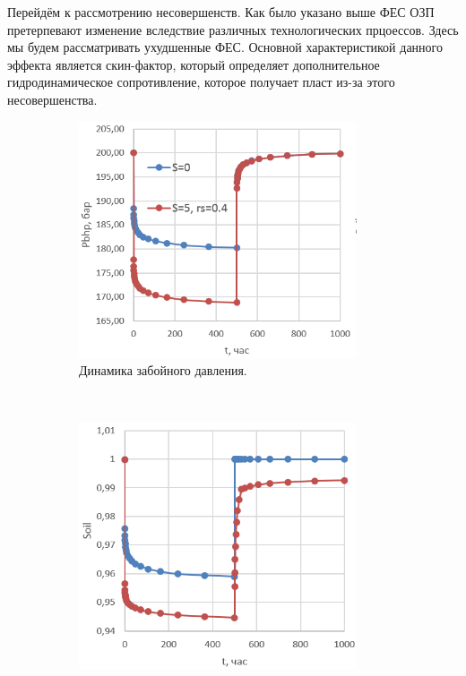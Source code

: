 	Перейдём к рассмотрению несовершенств.
	Как было указано выше ФЕС ОЗП претерпевают изменение вследствие различных технологических прцоессов.
	Здесь мы будем рассматривать ухудшенные ФЕС.
	Основной характеристикой данного эффекта является скин-фактор, который определяет дополнительное гидродинамическое сопротивление, которое получает пласт из-за этого несовершенства.
\begin{figure}[H]
	\begin{subfigure}[b]{0.5\textwidth}
	\centering
	\includegraphics[width=0.9\textwidth]{pic/pres_fes.png}
	\caption{Динамика забойного давления.}
	\label{pic:pres_fes}
	\end{subfigure}
~
	\begin{subfigure}[b]{0.5\textwidth}
		\centering
		\includegraphics[width=0.9\textwidth]{pic/sat_fes.png}

\end{subfigure}
\end{figure}
